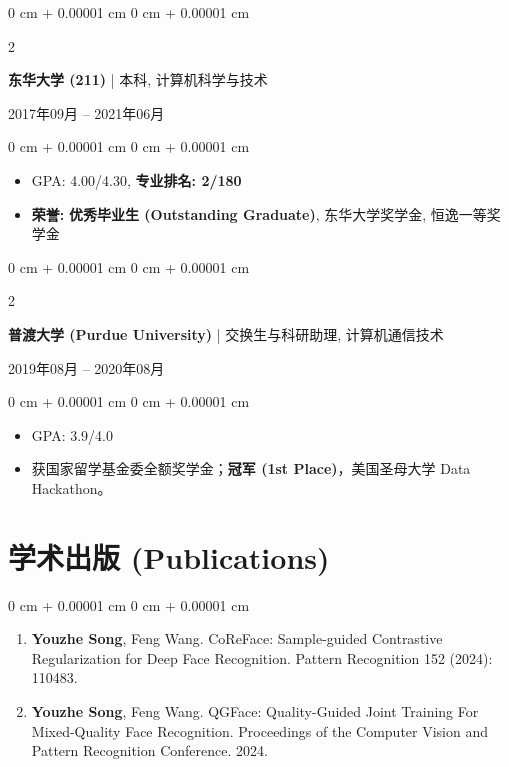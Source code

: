 \documentclass[10pt, letterpaper]{article}
\newenvironment{highlights}{
    \begin{itemize}[
        topsep=0.10 cm,
        parsep=0.10 cm,
        partopsep=0pt,
        itemsep=0pt,
        leftmargin=0 cm + 10pt
    ]
}{
    \end{itemize}
} %
\newenvironment{onecolentry}{
    \begin{adjustwidth}{
        0 cm + 0.00001 cm
    }{
        0 cm + 0.00001 cm
    }
}{
    \end{adjustwidth}
} %
\newenvironment{twocolentry}[2][]{
    \onecolentry
    \def\secondColumn{#2}
    \setcolumnwidth{\fill, 4.5 cm}
    \begin{paracol}{2}
}{
    \switchcolumn \raggedleft \secondColumn
    \end{paracol}
    \endonecolentry
} %
\begin{document}
        \vspace{0.2 cm}
        
        \begin{twocolentry}{
            2017年09月 – 2021年06月
        }
            \textbf{东华大学 (211)} | 本科, 计算机科学与技术
        \end{twocolentry}
        \vspace{0.10 cm}
        \begin{onecolentry}
            \begin{highlights}
                \item GPA: 4.00/4.30, \textbf{专业排名: 2/180}
                \item \textbf{荣誉:} \textbf{优秀毕业生 (Outstanding Graduate)}, 东华大学奖学金, 恒逸一等奖学金
            \end{highlights}
        \end{onecolentry}
        
        \vspace{0.2 cm}

        \begin{twocolentry}{
            2019年08月 – 2020年08月
        }
            \textbf{普渡大学 (Purdue University)} | 交换生与科研助理, 计算机通信技术
        \end{twocolentry}
        \vspace{0.10 cm}
        \begin{onecolentry}
            \begin{highlights}
                \item GPA: 3.9/4.0
                \item 获国家留学基金委全额奖学金；\textbf{冠军 (1st Place)}，美国圣母大学 Data Hackathon。
            \end{highlights}
        \end{onecolentry}
        
    \section{学术出版 (Publications)}

\begin{onecolentry}
    \begin{enumerate}[
        label=\arabic*.,
        topsep=0pt,
        parsep=0pt,
        partopsep=0pt,
        itemsep=0.2cm,
        leftmargin=*
    ]
        \item \textbf{Youzhe Song}, Feng Wang. CoReFace: Sample-guided Contrastive Regularization for Deep Face Recognition.
        Pattern Recognition 152 (2024): 110483.
        \href{https://doi.org/10.1016/j.patcog.2024.110483}{\faLink}
        \href{https://github.com/IsidoreSong/CoreFace}{\faGithub}
        
        \item \textbf{Youzhe Song}, Feng Wang. QGFace: Quality-Guided Joint Training For Mixed-Quality Face Recognition.
        Proceedings of the Computer Vision and Pattern Recognition Conference. 2024. \href{https://arxiv.org/abs/2312.17494}{\faLink}
        \href{https://github.com/IsidoreSong/QGFace}{\faGithub}
    \end{enumerate}
\end{onecolentry}
\end{document}
